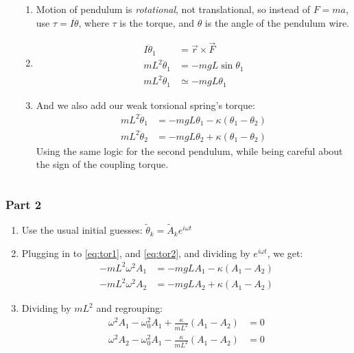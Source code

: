 \documentclass[pdf,handout, hideothersubsections]{beamer}
\begin{document}
\begin{frame}
\begin{columns}[T]
\begin{column}{0.3\textwidth}
  \end{column}
\pause
  \begin{column}{0.7\textwidth}
  \begin{enumerate}
  \item Motion of pendulum is \emph{rotational}, not translational, so instead of $F = m a$, use $\tau = I \ddot{\theta}$, where $\tau$ is the torque, and $\theta$ is the angle of the pendulum wire. \\
    \pause
  \item   
    \begin{align*}
      I \ddot{\theta}_1 &= \vec{r} \times \vec{F} \\
      m L^2 \ddot{\theta}_1 &= -m g L \sin{\theta_1} \\
      m L^2 \ddot{\theta}_1 &\simeq -m g L \theta_1
    \end{align*}
   \pause
   \item And we also add our weak torsional spring's torque:
\begin{align}
 m L^2 \ddot{\theta}_1 &= -m g L \theta_1 - \kappa (\theta_1 -
                         \theta_2) \label{eq:tor1}\\
 m L^2 \ddot{\theta}_2 &= -m g L \theta_2 + \kappa (\theta_1 -
     \theta_2) \label{eq:tor2}
\end{align}
Using the same logic for the second pendulum, while being careful
about the sign of the coupling torque.     

  \end{enumerate}

  \end{column}

\end{columns}

\end{frame}
\endgroup

\begingroup
\footnotesize
\begin{frame}
\frametitle{Part 2}
\begin{enumerate}
\item Use the usual initial guesses: $\tilde{\theta}_k = \tilde{A}_k
  e^{i \omega t}$
\item Plugging in to \eqref{eq:tor1}, and \eqref{eq:tor2}, and dividing by $e^{i \omega t}$, we get:
\begin{align}
 -m L^2 \omega^2 A_1 &= -m g L A_1 - \kappa (A_1 - A_2) \\
 -m L^2 \omega^2 A_2 &= -m g L A_2 + \kappa (A_1 - A_2)
\end{align}
\item Dividing by $m L^2$ and regrouping:
\begin{align}
 \omega^2 A_1 - \omega_0^2 A_1 + \frac{\kappa}{m L^2} (A_1 - A_2) &= 0 \\
 \omega^2 A_2 - \omega_0^2 A_1 - \frac{\kappa}{m L^2} (A_1 - A_2) &= 0
\end{align}

\end{enumerate}
\end{frame}
\endgroup
\end{document}
